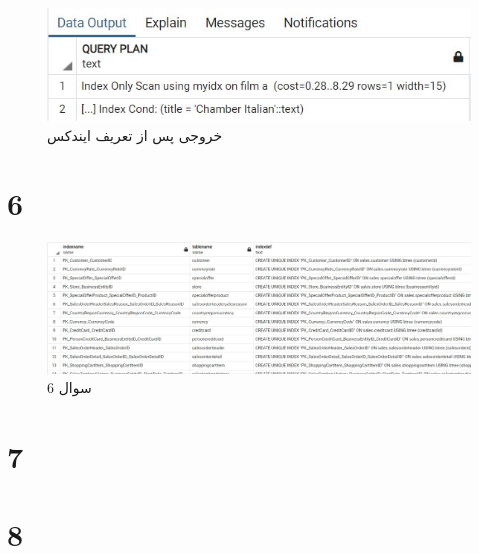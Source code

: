 \documentclass{article}
\begin{document}
\begin{figure}[H]
    \centering
    \includegraphics[width=1\textwidth]{figures/5-d.jpg}
    \caption
	{
خروجی  پس از تعریف ایندکس
	}
    \label{fig:fig1}
\end{figure}


\section{6}
\begin{figure}[H]
    \centering
    \includegraphics[width=1\textwidth]{figures/6.jpg}
    \caption
	{
سوال 6
	}
    \label{fig:fig1}
\end{figure}


\section{7}
\subsection{}
\subsection{}
\subsection{}
\subsection{}


\section{8}
\end{document}
